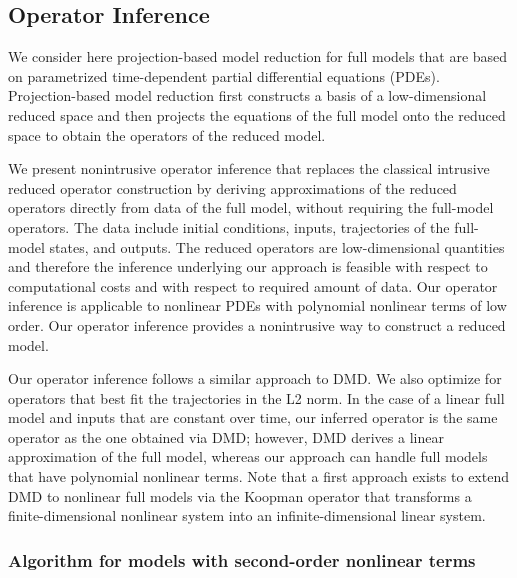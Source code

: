 \documentclass{article}
\begin{document}
\newpage

\subsection{Operator Inference}

\vspace{1cm}

We consider here projection-based model reduction for full models that are based on parametrized time-dependent partial differential equations (PDEs). Projection-based model reduction first constructs a basis of a low-dimensional reduced space and then projects the equations of the full model onto the reduced space to obtain the operators of the reduced model.

We present nonintrusive
operator inference that replaces the classical intrusive reduced operator construction by deriving approximations of the reduced operators directly from data of the full model, without requiring the full-model operators. The data include initial conditions, inputs, trajectories of the full-model states, and outputs. The reduced operators are low-dimensional quantities and therefore the inference underlying our approach is feasible with respect to computational costs and with respect to required amount of data. Our operator inference is applicable to nonlinear PDEs with polynomial nonlinear terms of low order. Our operator inference provides a nonintrusive way to construct a reduced model.

Our operator inference follows a similar approach to DMD. We also optimize for operators that best fit the trajectories in the L2 norm. In the case of a linear full model and inputs that are constant over time, our inferred operator is the same operator as the one obtained via DMD; however, DMD derives a linear approximation of the full model, whereas our approach can handle full models that have polynomial nonlinear terms. Note that a first approach exists to extend DMD to nonlinear full models via the Koopman operator that transforms a finite-dimensional nonlinear system into an infinite-dimensional linear system.

\vspace{1cm}

\subsubsection*{Algorithm  for models with second-order nonlinear terms}

\vspace{1cm}
\end{document}

